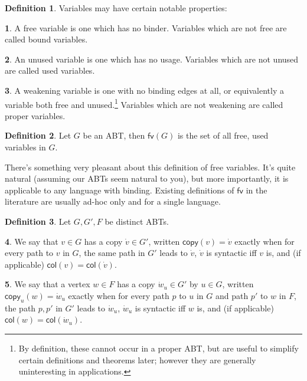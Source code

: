 \documentclass[11pt]{article} %
\theoremstyle{definition}
\newtheorem{dfn}{Definition}
\newtheorem{subdfn}{\indent}[dfn]
\begin{document}
\begin{dfn}
Variables may have certain notable properties:
\begin{subdfn}
A free variable is one which has no binder.
Variables which are not free are called bound variables.
\end{subdfn}
\begin{subdfn}
An unused variable is one which has no usage.
Variables which are not unused are called used variables.
\end{subdfn}
\begin{subdfn}
A weakening variable is one with no binding edges at all, or equivalently a variable both free and unused.\footnote{By definition, these cannot occur in a proper ABT, but are useful to simplify certain definitions and theorems later; however they are generally uninteresting in applications.}
Variables which are not weakening are called proper variables.
\end{subdfn}
\end{dfn}

\begin{dfn}
Let $G$ be an ABT, then $\mathsf{fv}(G)$ is the set of all free, used variables in $G$.
\end{dfn}

There's something very pleasant about this definition of free variables.
It's quite natural (assuming our ABTs seem natural to you), but more importantly, it is applicable to any language with binding.
Existing definitions of $\mathsf{fv}$ in the literature are usually ad-hoc only and for a single language.

\begin{dfn}
Let $G, G', F$ be distinct ABTs.
\begin{subdfn}
    We say that $v \in G$ has a copy $\dot v \in G'$, written $\mathsf{copy}(v) = \dot v$ exactly when
    for every path to $v$ in $G$, the same path in $G'$ leads to $\dot v$,
    $\dot v$ is syntactic iff $v$ is, and
    (if applicable) $\mathsf{col}(v) = \mathsf{col}(\dot v)$.
\end{subdfn}
\begin{subdfn}
    We say that a vertex $w \in F$ has a copy $\dot w_u \in G'$ by $u \in G$, written $\mathsf{copy}_u(w) = \dot w_u$ exactly when
    for every path $p$ to $u$ in $G$ and path $p'$ to $w$ in $F$, the path $p,p'$ in $G'$ leads to $\dot w_u$,
    $\dot w_u$ is syntactic iff $w$ is, and
    (if applicable) $\mathsf{col}(w) = \mathsf{col}(\dot w_u)$.
\end{subdfn}
\end{dfn}
\end{document}
